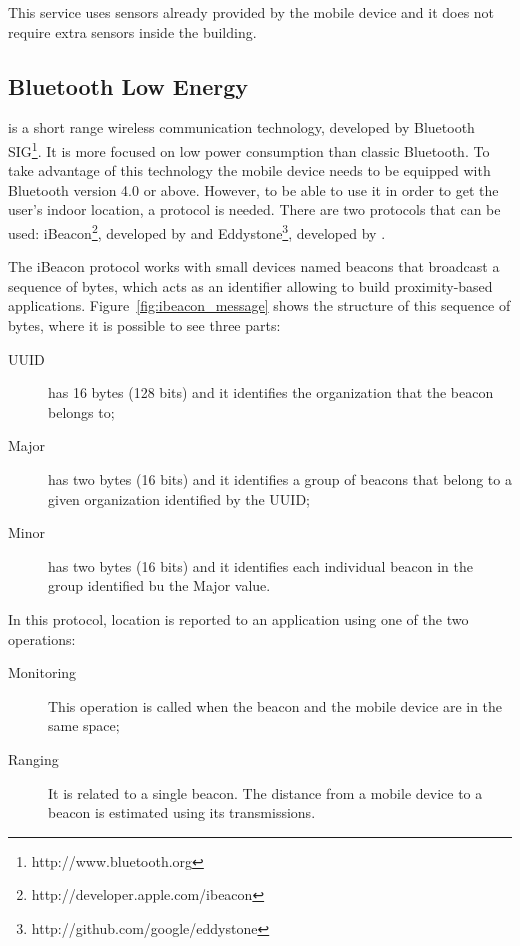This service uses sensors already provided by the mobile device and it does not require extra sensors inside the building.

\subsection{Bluetooth Low Energy}
\label{sub:background_bluetooth_low_energy}
\cite{ble} is a short range wireless communication technology, developed by Bluetooth \gls{SIG}\footnote{http://www.bluetooth.org}.
It is more focused on low power consumption than classic Bluetooth.
To take advantage of this technology the mobile device needs to be equipped with Bluetooth version 4.0\cite{bluetooth_specification} or above.
However, to be able to use it in order to get the user's indoor location, a protocol is needed.
There are two protocols that can be used: iBeacon\footnote{http://developer.apple.com/ibeacon}, developed by  and Eddystone\footnote{http://github.com/google/eddystone}, developed by .

The iBeacon protocol works with small devices named beacons that broadcast a sequence of bytes, which acts as an identifier allowing to build proximity-based applications\cite{ibeacon_book}.
Figure~\ref{fig:ibeacon_message} shows the structure of this sequence of bytes, where it is possible to see three parts:
\begin{description}
  \item[\gls{UUID}] has 16 bytes (128 bits) and it identifies the organization that the beacon belongs to;
  \item[Major] has two bytes (16 bits) and it identifies a group of beacons that belong to a given organization identified by the \gls{UUID};
  \item[Minor] has two bytes (16 bits) and it identifies each individual beacon in the group identified bu the Major value.
\end{description}
In this protocol, location is reported to an application using one of the two operations:
\begin{description}
  \item[Monitoring] This operation is called when the beacon and the mobile device are in the same space;
  \item[Ranging] It is related to a single beacon. The distance from a mobile device to a beacon is estimated using its transmissions.
\end{description}

